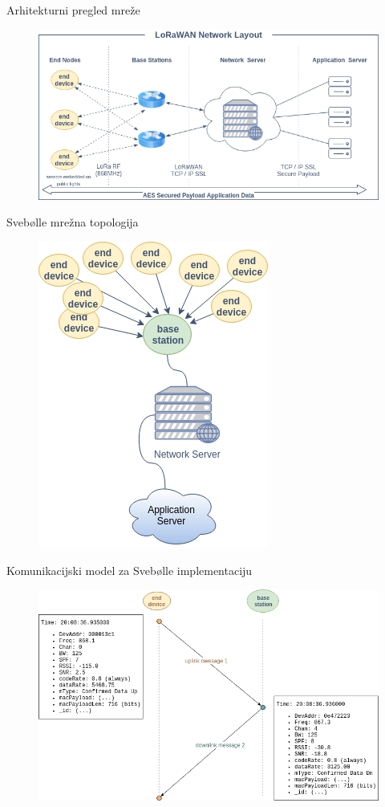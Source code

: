 \documentclass{beamer}
\begin{document}
  \begin{frame}{Arhitekturni pregled mreže}
    \begin{figure}
      \includegraphics[width=\linewidth]{images/LoRaWAN-Network-Layout.png}
    \end{figure}
  \end{frame}

  \begin{frame}{Svebølle mrežna topologija}
    \begin{figure}
      \includegraphics[width=0.48\linewidth]{images/Svebolle-Topology.png}
    \end{figure}
  \end{frame}

  \begin{frame}{Komunikacijski model za Svebølle implementaciju}
    \begin{figure}
      \includegraphics[width=\linewidth]{images/Svebolle-ed-bs-model.png}
    \end{figure}
  \end{frame}
\end{document}
